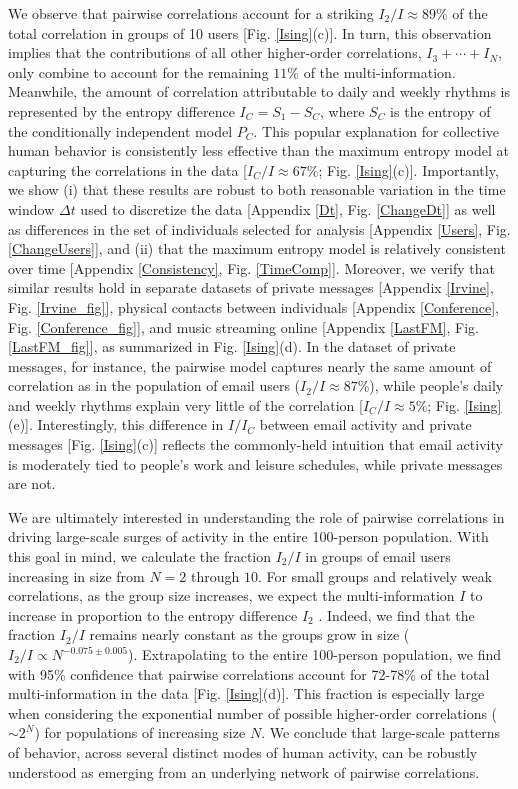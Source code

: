 \documentclass[aps,reprint,superscriptaddress,amsmath,amssymb,longbibliography]{revtex4-1}
\begin{document}
We observe that pairwise correlations account for a striking $I_2/I\approx 89\%$ of the total correlation in groups of 10 users [Fig. \ref{Ising}(c)]. In turn, this observation implies that the contributions of all other higher-order correlations, $I_3 + \cdots + I_N$, only combine to account for the remaining $11\%$ of the multi-information. Meanwhile, the amount of correlation attributable to daily and weekly rhythms is represented by the entropy difference $I_C = S_1 - S_C$, where $S_C$ is the entropy of the conditionally independent model $P_C$. This popular explanation for collective human behavior is consistently less effective than the maximum entropy model at capturing the correlations in the data [$I_C/I\approx 67\%$; Fig. \ref{Ising}(c)]. Importantly, we show (i) that these results are robust to both reasonable variation in the time window $\Delta t$ used to discretize the data [Appendix \ref{Dt}, Fig. \ref{ChangeDt}] as well as differences in the set of individuals selected for analysis [Appendix \ref{Users}, Fig. \ref{ChangeUsers}], and (ii) that the maximum entropy model is relatively consistent over time [Appendix \ref{Consistency}, Fig. \ref{TimeComp}]. Moreover, we verify that similar results hold in separate datasets of private messages [Appendix \ref{Irvine}, Fig. \ref{Irvine_fig}], physical contacts between individuals [Appendix \ref{Conference}, Fig. \ref{Conference_fig}], and music streaming online [Appendix \ref{LastFM}, Fig. \ref{LastFM_fig}], as summarized in Fig. \ref{Ising}(d). In the dataset of private messages, for instance, the pairwise model captures nearly the same amount of correlation as in the population of email users ($I_2/I\approx 87\%$), while people's daily and weekly rhythms explain very little of the correlation [$I_C/I\approx 5\%$; Fig. \ref{Ising}(e)].  Interestingly, this difference in $I/I_C$ between email activity and private messages [Fig. \ref{Ising}(c)] reflects the commonly-held intuition that email activity is moderately tied to people's work and leisure schedules, while private messages are not.

We are ultimately interested in understanding the role of pairwise correlations in driving large-scale surges of activity in the entire 100-person population.  With this goal in mind, we calculate the fraction $I_2/I$ in groups of email users increasing in size from $N=2$ through $10$. For small groups and relatively weak correlations, as the group size increases, we expect the multi-information $I$ to increase in proportion to the entropy difference $I_2$ \cite{Schneidman-01}. Indeed, we find that the fraction $I_2/I$ remains nearly constant as the groups grow in size ($I_2/I\propto N^{-0.075\pm 0.005}$). Extrapolating to the entire 100-person population, we find with 95\% confidence that pairwise correlations account for 72-78\% of the total multi-information in the data [Fig. \ref{Ising}(d)]. This fraction is especially large when considering the exponential number of possible higher-order correlations ($\sim 2^N$) for populations of increasing size $N$. We conclude that large-scale patterns of behavior, across several distinct modes of human activity, can be robustly understood as emerging from an underlying network of pairwise correlations.
\end{document}
